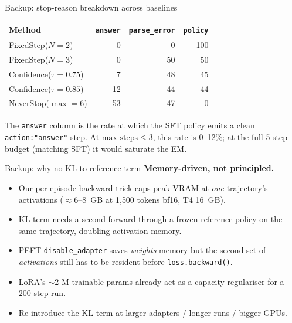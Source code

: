 \documentclass[aspectratio=169]{beamer}
\begin{document}
\appendix

\begin{frame}{Backup: stop-reason breakdown across baselines}
\centering\small
\begin{tabular}{lrrr}
\toprule
Method & \texttt{answer} & \texttt{parse\_error} & \texttt{policy} \\
\midrule
FixedStep($N{=}2$)         & 0  & 0   & 100 \\
FixedStep($N{=}3$)         & 0  & 50  & 50  \\
Confidence($\tau{=}0.75$)  & 7  & 48  & 45  \\
Confidence($\tau{=}0.85$)  & 12 & 44  & 44  \\
NeverStop($\max{=}6$)      & 53 & 47  & 0   \\
\bottomrule
\end{tabular}

\vspace{0.7em}

The \texttt{answer} column is the rate at which the SFT policy
emits a clean \texttt{action:"answer"} step. At
$\mathrm{max\_steps}\leq 3$, this rate is 0--12\%; at the full
5-step budget (matching SFT) it would saturate the EM.
\end{frame}

\begin{frame}{Backup: why no KL-to-reference term}
\textbf{Memory-driven, not principled.}

\begin{itemize}
  \item Our per-episode-backward trick caps peak VRAM at \emph{one}
  trajectory's activations ($\approx 6$--$8$~GB at 1{,}500 tokens
  bf16, T4 16~GB).
  \item KL term needs a second forward through a frozen reference
  policy on the same trajectory, doubling activation memory.
  \item PEFT \texttt{disable\_adapter} saves \emph{weights} memory
  but the second set of \emph{activations} still has to be resident
  before \texttt{loss.backward()}.
  \item LoRA's $\sim$2 M trainable params already act as a capacity
  regulariser for a 200-step run.
  \item Re-introduce the KL term at larger adapters / longer runs / bigger GPUs.
\end{itemize}
\end{frame}
\end{document}
